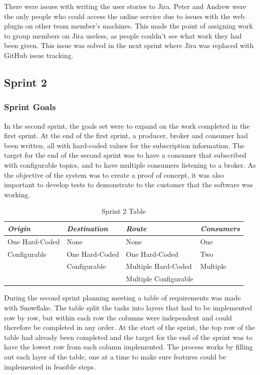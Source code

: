 \documentclass[a4paper, 12pt, twoside]{article}
\begin{document}
There were issues with writing the user stories to Jira. Peter and Andrew were the only people who could access the online service due to issues with the web plugin on other team member's machines. This made the point of assigning work to group members on Jira useless, as people couldn't see what work they had been given. This issue was solved in the next sprint where Jira was replaced with GitHub issue tracking.

\subsection{Sprint 2}
\label{sec:impl_sprint_2}

\subsubsection{Sprint Goals}

In the second sprint, the goals set were to expand on the work completed in the first sprint. At the end of the first sprint, a producer, broker and consumer had been written, all with hard-coded values for the subscription information. The target for the end of the second sprint was to have a consumer that subscribed with configurable topics, and to have multiple consumers listening to a broker. As the objective of the system was to create a proof of concept, it was also important to develop tests to demonstrate to the customer that the software was working.

\begin{table}
    \begin{tabular}{|l|l|l|l|}
    \hline
    \emph{Origin}         & \emph{Destination}    & \emph{Route}                 & \emph{Consumers} \\ \hline
    One Hard-Coded & None           & None                  & One       \\ \hline
    Configurable   & One Hard-Coded & One Hard-Coded        & Two       \\ \hline
    ~              & Configurable   & Multiple Hard-Coded   & Multiple  \\ \hline
    ~              & ~              & Multiple Configurable & ~         \\ \hline
    \end{tabular}
\caption{Sprint 2 Table}
\label{tab:sprint2}
\end{table}

During the second sprint planning meeting a table of requirements was made with Snowflake. The table split the tasks into layers that had to be implemented row by row, but within each row the columns were independent and could therefore be completed in any order. At the start of the sprint, the top row of the table had already been completed and the target for the end of the sprint was to have the lowest row from each column implemented. The process works by filling out each layer of the table, one at a time to make sure features could be implemented in feasible steps.
\end{document}
